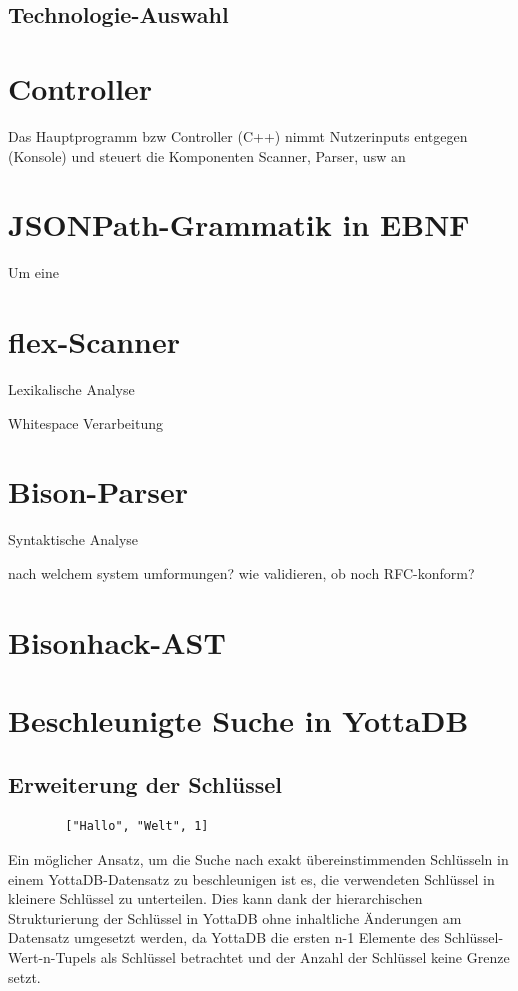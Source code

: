 \documentclass[oneside]{ausarbeitung}
\begin{document}
	
	
	\subsection{Technologie-Auswahl}
	
	\section{Controller}
	Das Hauptprogramm bzw Controller (C++) nimmt Nutzerinputs entgegen (Konsole) und steuert die Komponenten Scanner, Parser, usw an
	
	\section{JSONPath-Grammatik in EBNF}
	
	Um eine 
	
	\section{flex-Scanner}
	Lexikalische Analyse
	
	Whitespace Verarbeitung
	
	\section{Bison-Parser}
	Syntaktische Analyse
	
	nach welchem system umformungen? 
	wie validieren, ob noch RFC-konform?
	
	\section{Bisonhack-AST}
	
	\section{Beschleunigte Suche in YottaDB}
	
	
	
	\subsection{Erweiterung der Schlüssel}
	
	\begin{lstlisting}
		["Hallo", "Welt", 1]
	\end{lstlisting}
	
	Ein möglicher Ansatz, um die Suche nach exakt übereinstimmenden Schlüsseln in einem YottaDB-Datensatz zu beschleunigen ist es, die verwendeten Schlüssel in kleinere Schlüssel zu unterteilen. Dies kann dank der hierarchischen Strukturierung der Schlüssel in YottaDB ohne inhaltliche Änderungen am Datensatz umgesetzt werden, da YottaDB die ersten n-1 Elemente des Schlüssel-Wert-n-Tupels als Schlüssel betrachtet und der Anzahl der Schlüssel keine Grenze setzt.
	
\end{document}
